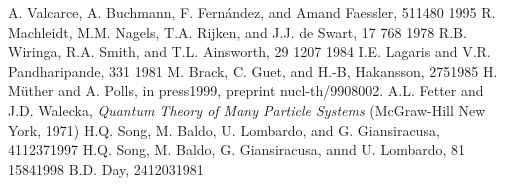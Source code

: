 \begin{thebibliography}{99}


 A. Valcarce, A. Buchmann, F. Fern\'andez, and Amand Faessler,
\Journal{\PRC} {51}{1480} {1995} 
 R. Machleidt, 
 M.M. Nagels, T.A. Rijken, and J.J. de Swart, \Journal{\PRD} 
{17} {768} {1978}
 R.B. Wiringa, R.A. Smith, and T.L. Ainsworth, \Journal{\PRC}
{29} {1207} {1984}
 I.E. Lagaris and V.R. Pandharipande,  
{331} {1981}
 M. Brack, C. Guet, and H.-B, Hakansson, 
{275}{1985}
 H. M\"uther and A. Polls, \Journal{\PRC} {}{in press}{1999}, 
preprint nucl-th/9908002.
 A.L. Fetter and J.D. Walecka, {\it Quantum Theory of Many 
Particle Systems} (McGraw-Hill New York, 1971)
 H.Q. Song, M. Baldo, U. Lombardo, and G. Giansiracusa,
\Journal{\PLB} {411}{237}{1997}
 H.Q. Song, M. Baldo, G. Giansiracusa, annd U. Lombardo, 
\Journal{\PRL} {81} {1584}{1998}
 B.D. Day, \Journal{\PRC} {24}{1203}{1981}

\end{thebibliography}